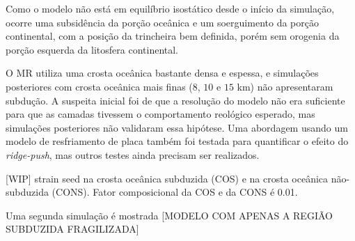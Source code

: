 Como o modelo não está em equilíbrio isostático desde o início da simulação, ocorre uma subsidência da porção oceânica e um soerguimento da porção continental, com a posição da trincheira bem definida, porém sem orogenia da porção esquerda da litosfera continental.

O MR utiliza uma crosta oceânica bastante densa e espessa, e simulações posteriores com crosta oceânica mais finas ($8$, $10$ e $15$ km) não apresentaram subdução. A suspeita inicial foi de que a resolução do modelo não era suficiente para que as camadas tivessem o comportamento reológico esperado, mas simulações posteriores não validaram essa hipótese. Uma abordagem usando um modelo de resfriamento de placa \citep{turcotte2002geodynamics} também foi testada para quantificar o efeito do \textit{ridge-push}, mas outros testes ainda precisam ser realizados.


[WIP] strain seed na crosta oceânica subduzida (COS) e na crosta oceânica não-subduzida (CONS). Fator composicional da COS e da CONS é 0.01.


Uma segunda simulação é mostrada 
[MODELO COM APENAS A REGIÃO SUBDUZIDA FRAGILIZADA]


